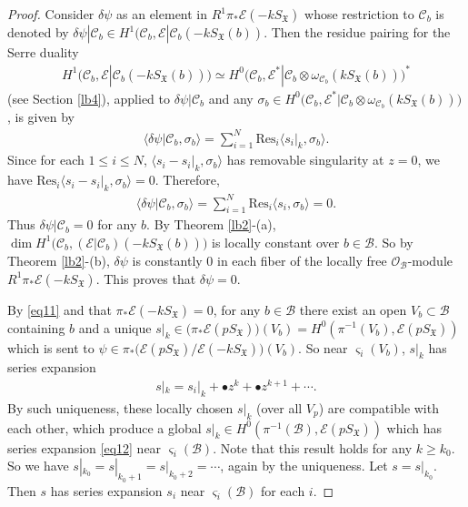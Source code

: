 \documentclass[12pt,a4paper,notitlepage]{report}
\theoremstyle{definition}
\theoremstyle{plain}
\newcommand{\fk}{\mathfrak}
\newcommand{\mc}{\mathcal}
\newcommand{\Res}{\mathrm{Res}}
\newcommand{\bk}[1]{\langle {#1}\rangle}
\newcommand{\scr}{\mathscr}
\newcommand{\sgm}{\varsigma}
\newcommand{\SX}{S_{\fk X}}
\numberwithin{equation}{section}
\begin{document}
\begin{proof}
Consider $\delta\psi$ as an element in $R^1\pi_*\scr E(-k\SX)$ whose restriction to $\mc C_b$ is denoted by $\delta\psi|\mc C_b\in H^1(\mc C_b,\scr E|\mc C_b(-k \SX(b))$. Then the residue pairing for the Serre duality
\begin{align*}
H^1(\mc C_b,\scr E|\mc C_b(-k \SX(b)))\simeq H^0\big(\mc C_b,\scr E^*|\mc C_b\otimes\omega_{\mc C_b}(k\SX(b))\big)^*
\end{align*}
(see Section \ref{lb4}), applied to $\delta\psi|\mc C_b$ and any $\sigma_b\in H^0\big(\mc C_b,\scr E^*|\mc C_b\otimes\omega_{\mc C_b}(k\SX(b))\big)$, is given by
\begin{align*}
\bk{\delta\psi|\mc C_b,\sigma_b}=\sum_{i=1}^N\Res_i\bk{s_i|_k,\sigma_b}.
\end{align*}
Since for each $1\leq i\leq N$, $\bk{s_i-s_i|_k,\sigma_b}$ has removable singularity at $z=0$, we have $\Res_i\bk{s_i-s_i|_k,\sigma_b}=0$. Therefore, 
\begin{align*}
\bk{\delta\psi|\mc C_b,\sigma_b}=\sum_{i=1}^N\Res_i\bk{s_i,\sigma_b}=0.
\end{align*}
Thus $\delta\psi|\mc C_b=0$ for any $b$. By Theorem \ref{lb2}-(a), $\dim H^1\big(\mc C_b,(\scr E|\mc C_b)(-k\SX(b))\big)$ is locally constant over $b\in\mc B$. So by Theorem \ref{lb2}-(b), $\delta\psi$ is constantly $0$ in each fiber of the locally free $\scr O_{\mc B}$-module $R^1\pi_*\scr E(-k\SX)$. This proves that $\delta\psi=0$. 

By \eqref{eq11} and that $\pi_*\scr E(-k\SX)=0$, for any $b\in\mc B$ there exist an open $V_b\subset\mc B$ containing $b$  and a unique $s|_k\in\big(\pi_*\scr E(p\SX)\big)(V_b)= H^0(\pi^{-1}(V_b),\scr E(p\SX))$ which is sent to $\psi\in \pi_*\big(\scr E(p\SX)/\scr E(-k\SX)\big)(V_b)$. So near $\sgm_i(V_b)$, $s|_k$ has series expansion
\begin{align}
s|_k=s_i|_k+\bullet z^k+\bullet z^{k+1}+\cdots.\label{eq12}
\end{align}
By such uniqueness, these locally chosen $s|_k$ (over all $V_p$) are compatible with each other, which produce a global $s|_k\in H^0(\pi^{-1}(\mc B),\scr E(p\SX))$ which has series expansion \eqref{eq12} near $\sgm_i(\mc B)$. Note that this result holds for any $k\geq k_0$. So we have $s|_{k_0}=s|_{k_0+1}=s|_{k_0+2}=\cdots$, again by the uniqueness. Let $s=s|_{k_0}$. Then $s$ has series expansion $s_i$ near $\sgm_i(\mc B)$ for each $i$.
\end{proof}
\end{document}
